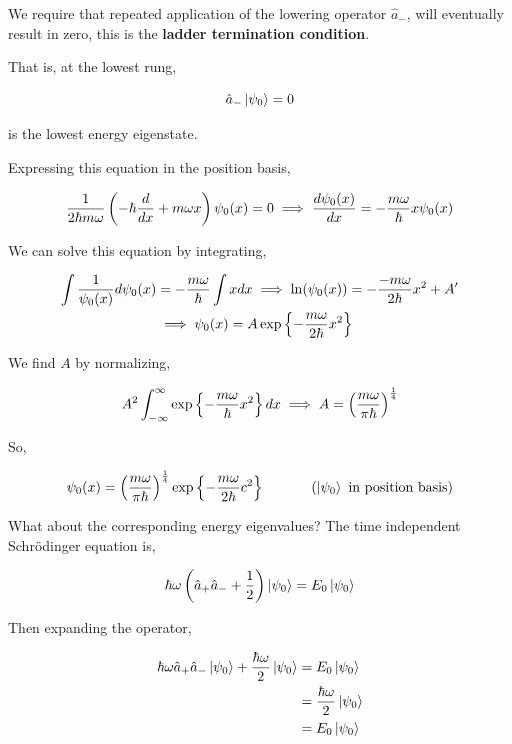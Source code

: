 \documentclass[english, 11pt]{article}
\begin{document}
       \begin{defn}\label{Lowest Energy Eigenstate}
        We require that repeated application of the lowering operator $\hat{a}_-$, will eventually result in zero, this is the \textbf{ladder termination condition}.
       \end{defn}

       That is, at the lowest rung,

       \[ \hat{a}_-\left|\psi_0\right\rangle = 0 \]

       is the lowest energy eigenstate.

       Expressing this equation in the position basis,

       \[ \frac{1}{2\hbar m \omega} \left( -\hbar \frac{d}{dx} + m\omega x \right) \psi_0(x) = 0 \implies \frac{d\psi_0(x)}{dx} = -\frac{m\omega}{\hbar} x\psi_0(x) \]

       We can solve this equation by integrating,

       \begin{align*}
         \int \frac{1}{\psi_0(x)} d\psi_0(x) & = -\frac{m\omega}{\hbar} \int x dx \implies \ln(\psi_0(x)) = -\frac{-m\omega}{2\hbar}x^2 + A' \\
         & \implies \psi_0(x) = A\exp \left\{ -\frac{m\omega}{2\hbar}x^2 \right\}
       \end{align*}

       We find $A$ by normalizing,

       \begin{align*}
         A^2 \int_{-\infty}^{\infty} \exp \left\{ -\frac{m\omega}{\hbar}x^2 \right\} dx \implies A = \left( \frac{m\omega}{\pi \hbar} \right)^{\frac{1}{4}}
       \end{align*}

       So,

       \[ \psi_0(x) = \left( \f{m\omega}{\pi\hbar} \right)^{\f{1}{4}}\expo{-\f{m\omega}{2\hbar}c^2} \ \ \ \ \ \ \ \ \ \ (\ket{\psi_0} \mbox{ in position basis})\]

       What about the corresponding energy eigenvalues? The time independent Schrödinger equation is,

       \[ \hbar \omega \left(\hat{a}_+\hat{a}_- + \frac{1}{2}\right) \left|\psi_0\right\rangle = E_0 \left|\psi_0\right\rangle \]

       Then expanding the operator,

       \begin{align*}
         \hbar \omega \hat{a}_+\hat{a}_-\left|\psi_0\right\rangle + \frac{\hbar \omega}{2} \left|\psi_0\right\rangle & = E_0\left|\psi_0\right\rangle \\
        & = \frac{\hbar \omega}{2} \left|\psi_0\right\rangle \\
        & = E_0\left|\psi_0\right\rangle
       \end{align*}
\end{document}
